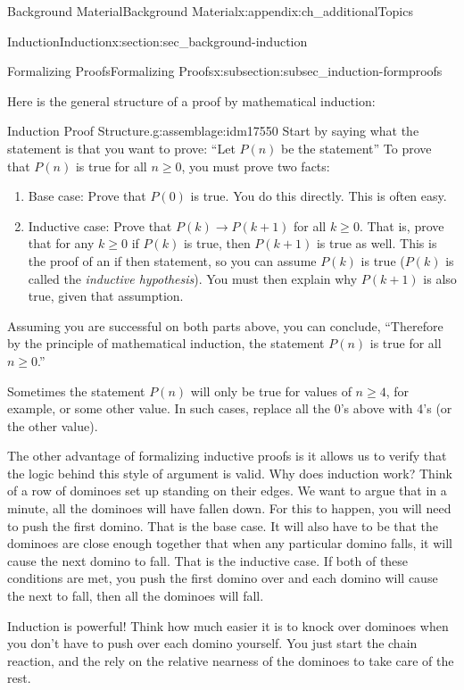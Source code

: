 \documentclass[oneside,10pt,]{book}
\numberwithin{equation}{chapter}
\def\imp{\rightarrow}
\begin{document}
\begin{appendixptx}{Background Material}{}{Background Material}{}{}{x:appendix:ch_additionalTopics}
\begin{sectionptx}{Induction}{}{Induction}{}{}{x:section:sec_background-induction}
\begin{subsectionptx}{Formalizing Proofs}{}{Formalizing Proofs}{}{}{x:subsection:subsec_induction-formproofs}
\par
Here is the general structure of a proof by mathematical induction:%
\begin{assemblage}{Induction Proof Structure.}{g:assemblage:idm17550}%
 Start by saying what the statement is that you want to prove: ``Let \(P(n)\) be the statement\textellipsis{}'' To prove that \(P(n)\) is true for all \(n \ge 0\), you must prove two facts:%
\begin{enumerate}
\item{}Base case: Prove that \(P(0)\) is true. You do this directly. This is often easy.%
\item{}Inductive case: Prove that \(P(k) \imp P(k+1)\) for all \(k \ge 0\). That is, prove that for any \(k \ge 0\) if \(P(k)\) is true, then \(P(k+1)\) is true as well. This is the proof of an if \textellipsis{} then \textellipsis{} statement, so you can assume \(P(k)\) is true (\(P(k)\) is called the \emph{inductive hypothesis}). You must then explain why \(P(k+1)\) is also true, given that assumption.%
\end{enumerate}
%
\par
Assuming you are successful on both parts above, you can conclude, ``Therefore by the principle of mathematical induction, the statement \(P(n)\) is true for all \(n \ge 0\).''%
\end{assemblage}
Sometimes the statement \(P(n)\) will only be true for values of \(n \ge 4\), for example, or some other value. In such cases, replace all the 0's above with 4's (or the other value).%
\par
The other advantage of formalizing inductive proofs is it allows us to verify that the logic behind this style of argument is valid. Why does induction work? Think of a row of dominoes set up standing on their edges. We want to argue that in a minute, all the dominoes will have fallen down. For this to happen, you will need to push the first domino. That is the base case. It will also have to be that the dominoes are close enough together that when any particular domino falls, it will cause the next domino to fall. That is the inductive case. If both of these conditions are met, you push the first domino over and each domino will cause the next to fall, then all the dominoes will fall.%
\par
Induction is powerful! Think how much easier it is to knock over dominoes when you don't have to push over each domino yourself. You just start the chain reaction, and the rely on the relative nearness of the dominoes to take care of the rest.%

\end{subsectionptx}
\end{sectionptx}
\end{appendixptx}
\end{document}
